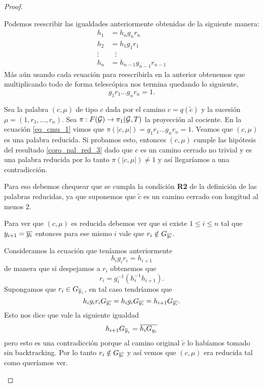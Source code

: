 \documentclass[tesis.tex]{subfiles}
\begin{document}
\begin{proof}
\begin{itemize}
		Podemos reescribir las igualdades anteriormente obtenidas de la siguiente manera:
		\begin{align*}
			h_1 &= h_{n}g_{n}r_{n} \\
			h_2 &= h_1g_1r_1 \\
			\vdots & \ \ \ \vdots \\
			h_n &= h_{n-1}g_{n-1}r_{n-1} 
		\end{align*}
		Más aún usando cada ecuación para reescribirla en la anterior obtenemos que multiplicando todo de forma telescópica nos termina quedando lo siguiente,
		\begin{equation}\label{eq_cmu_1}
			g_1r_1\dots g_nr_n = 1.
		\end{equation} 
		
		
		Sea la palabra $(c, \mu)$ de tipo $c$ dada por el camino $c= q(\tilde c)$ y la sucesión $\mu = (1,r_1, \dots, r_n)$.
		Sea $\pi:F({\cal G}) \to \pi_1({\cal G},T)$ la proyección al cociente.
		En la ecuación \ref{eq_cmu_1} vimos que $\pi(|c, \mu|) = g_1r_1\dots g_nr_n = 1$.
		Veamos que $(c, \mu)$ es una palabra reducida.
		Si probamos esto, entonces $(c, \mu)$ cumple las hipótesis del resultado \ref{coro_pal_red_3} dado que $c$ es un camino cerrado no trivial y es una palabra reducida por lo tanto $\pi(|c, \mu|) \neq 1$ y así llegaríamos a una contradicción.
		
		Para eso debemos chequear que se cumpla la condición \textbf{R2} de la definición de las palabras reducidas, ya que suponemos que $\widetilde c$ es un camino cerrado con longitud al menos $2$.
		
		Para ver que $(c, \mu)$ es reducida debemos ver que si
		existe $ 1 \le i \le n$ tal que $y_{i+1} = \overline{y_i}$ entonces para ese mismo $i$ vale que $r_i \notin G_{\overline{y_{i}}}$.
		
		
		Consideramos la ecuación que teníamos anteriormente
		\[
		h_ig_ir_i = h_{i+1}
		\]
		de manera que si despejamos a $r_{i}$ obtenemos que
		\[
		r_i =   g_i^{-1}(h_i^{-1} h_{i+1} ).
		\]
		Supongamos que $r_{i} \in G_{\overline y_{i}}$, en tal caso tendríamos que 
		\[
		 h_ig_ir_i G_{\overline{y_i}} = h_ig_i G_{\overline{y_i}} = h_{i+1}G_{\overline{y_i}}.
		\] 
		Esto nos dice que vale la siguiente igualdad 
		\[
		h_{i+1}G_{\overline y_{i}} = \overline{h_{i}G_{y_i}}
		\]
		pero esto es una contradicción porque al camino original $\tilde c$ lo habíamos tomado sin backtracking. 
		Por lo tanto $r_{i} \notin G_{\overline{y_{i}}}$ y así vemos que $(c, \mu)$ era reducida tal como queríamos ver.
	\end{itemize}
	
	
	
	
	
\end{proof}
\end{document}
